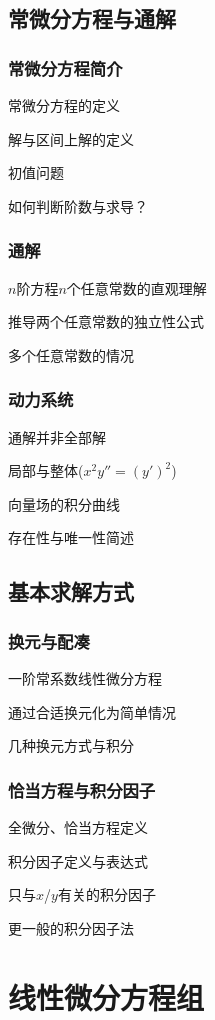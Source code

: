 \documentclass[a4paper,UTF8,fontset=windows,AutoFakeBold]{ctexart}
\theoremstyle{ex}
\begin{document}
\subsection{常微分方程与通解}
\subsubsection{常微分方程简介}
常微分方程的定义

解与区间上解的定义

初值问题

如何判断阶数与求导？

\subsubsection{通解}
$n$阶方程$n$个任意常数的直观理解

推导两个任意常数的独立性公式

多个任意常数的情况

\subsubsection{动力系统}
通解并非全部解

局部与整体($x^2y''=(y')^2$)

向量场的积分曲线

存在性与唯一性简述

\subsection{基本求解方式}
\subsubsection{换元与配凑}
一阶常系数线性微分方程

通过合适换元化为简单情况

几种换元方式与积分

\subsubsection{恰当方程与积分因子}
全微分、恰当方程定义

积分因子定义与表达式

只与$x$/$y$有关的积分因子

更一般的积分因子法

\newpage
\section{线性微分方程组}
\end{document}
